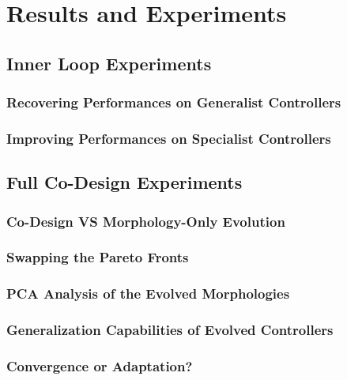 \chapter{Results and Experiments}
\section{Inner Loop Experiments}
\subsection{Recovering Performances on Generalist Controllers}
\subsection{Improving Performances on Specialist Controllers}

\section{Full Co-Design Experiments}
\subsection{Co-Design VS Morphology-Only Evolution}
\subsection{Swapping the Pareto Fronts}
\subsection{PCA Analysis of the Evolved Morphologies}
\subsection{Generalization Capabilities of Evolved Controllers}
\subsection{Convergence or Adaptation?}